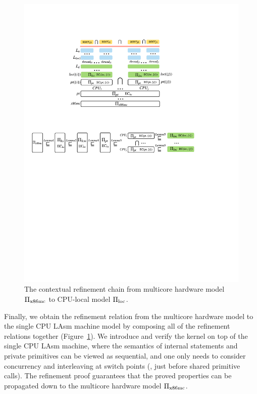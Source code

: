 \begin{figure}[t]\centering
\includegraphics[scale=0.9]{figs/machine_chain}
\caption{The contextual refinement chain from multicore hardware model
$\Pi_{\text{x86mc}}$ to CPU-local model $\Pi_{\text{loc}}$.}
\label{fig:spec:chain}
\hrulefill
\end{figure}

Finally, we obtain the refinement relation from the multicore
hardware model
to the single CPU LAsm machine model by composing
all of the refinement relations together (\cf Figure~\ref{fig:spec:chain}).
We introduce and verify the {\cCTOS} kernel on top of the
single CPU LAsm machine,
where the semantics of internal statements
and private primitives can be viewed as sequential,
and one only needs to consider concurrency
and interleaving at switch points (\ie, just before 
shared primitive calls).
The refinement proof guarantees that the proved properties can be
propagated down to the multicore hardware model $\Pi_{\text{x86mc}}$.


